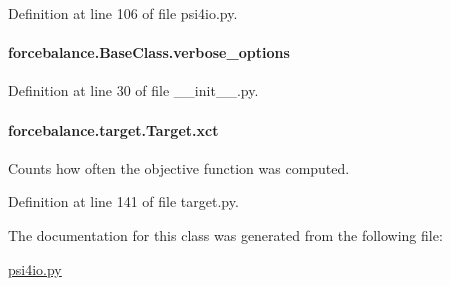 Definition at line 106 of file psi4io.\-py.

\hypertarget{classforcebalance_1_1BaseClass_afd68efa29ccd2f320f4cf82198214aac}{
\paragraph[{verbose\-\_\-options}]{\setlength{\rightskip}{0pt plus 5cm}forcebalance.\-Base\-Class.\-verbose\-\_\-options\hspace{0.3cm}{\ttfamily [inherited]}}}\label{classforcebalance_1_1BaseClass_afd68efa29ccd2f320f4cf82198214aac}


Definition at line 30 of file \-\_\-\-\_\-init\-\_\-\-\_\-.\-py.

\hypertarget{classforcebalance_1_1target_1_1Target_aad2e385cfbf7b4a68f1c2cb41133fe82}{
\paragraph[{xct}]{\setlength{\rightskip}{0pt plus 5cm}forcebalance.\-target.\-Target.\-xct\hspace{0.3cm}{\ttfamily [inherited]}}}\label{classforcebalance_1_1target_1_1Target_aad2e385cfbf7b4a68f1c2cb41133fe82}


Counts how often the objective function was computed. 



Definition at line 141 of file target.\-py.



The documentation for this class was generated from the following file\-:\begin{DoxyCompactItemize}
\item 
\hyperlink{psi4io_8py}{psi4io.\-py}\end{DoxyCompactItemize}

